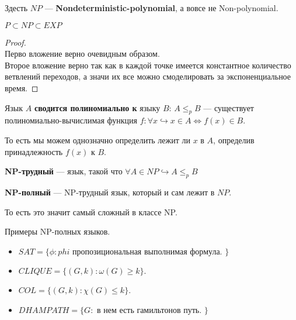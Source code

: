 \begin{note}
   Здесть $NP$ ---  \textbf{Nondeterministic-polynomial}, а вовсе не Non-polynomial. 
\end{note}

\begin{theorem}
   $P \subset NP \subset EXP$ 
\end{theorem}
\begin{proof} \ \\
   Перво вложение верно очевидным образом. \\
   Второе вложение верно так как в каждой точке имеется константное количество ветвлений переходов, а значи их все можно смоделировать за экспоненциальное время.
\end{proof}

\begin{Def}
    Язык $A$ \textbf{сводится полиномиально к} языку $B$: $A \leq_p B$ --- 
    существует полиномиально-вычислимая функция  $f: \forall x \hookrightarrow x \in A \iff f(x) \in B$.
\end{Def}
\begin{note}
    То есть мы можем однозначно определить лежит ли $x$ в  $A$, определив принадлежность $f(x)$ к $B$.
\end{note}

\begin{Def}
   \textbf{NP-трудный} --- язык, такой что $\forall A \in NP \hookrightarrow A \leq_p B$
\end{Def}

\begin{Def}
   \textbf{NP-полный} --- NP-трудный язык, который и сам лежит в  $NP$.
\end{Def}
\begin{note}
   То есть это значит самый сложный в классе NP. 
\end{note}

\begin{example}
    Примеры NP-полных языков. 
    \begin{itemize}
        \item $SAT = \{\phi: phi \text{ пропозициональная выполнимая формула. \}}$
        \item $CLIQUE = \{(G, k): \omega(G) \geq k\}$.
        \item $COL = \{(G, k): \chi(G) \leq k\}$.
        \item $DHAMPATH = \{G: \text{ в нем есть гамильтонов путь. }\}$
    \end{itemize} 
\end{example}

